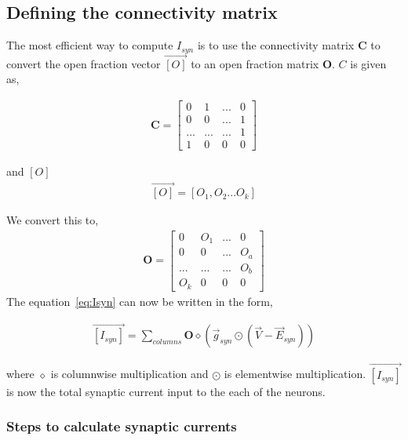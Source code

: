 \documentclass[10pt,letterpaper]{article}
\begin{document}
\subsection*{Defining the connectivity matrix}
The most efficient way to compute $I_{syn}$ is to use the connectivity matrix $\mathbf{C}$ to convert the open fraction vector $\vec{[O]}$ to an open fraction matrix $\mathbf{O}$. $C$ is given as,

\begin{eqnarray}
\mathbf{C}=
\begin{bmatrix}
0&1&...&0\\
0&0&...&1\\
...&...&...&1\\
1&0&0&0
\end{bmatrix}
\end{eqnarray}

and $[O]$
\begin{eqnarray}\vec{[O]}=[O_1,O_2...O_k]\end{eqnarray}

We convert this to,
\begin{eqnarray}
\mathbf{O}=
\begin{bmatrix}
0&O_1&...&0\\
0&0&...&O_a\\
...&...&...&O_b\\
O_k&0&0&0
\end{bmatrix}
\end{eqnarray}
The equation~\ref{eq:Isyn} can now be written in the form,

\begin{eqnarray}\vec{[I_{syn}]}=\sum_{columns}\mathbf{O}\diamond(\vec{g}_{syn}\odot(\vec{V}-\vec{E}_{syn}))\end{eqnarray}

where $\diamond$ is columnwise multiplication and $\odot$ is elementwise multiplication. $\vec{[I_{syn}]}$ is now the total synaptic current input to the each of the neurons.

\subsubsection*{Steps to calculate synaptic currents}
\end{document}
